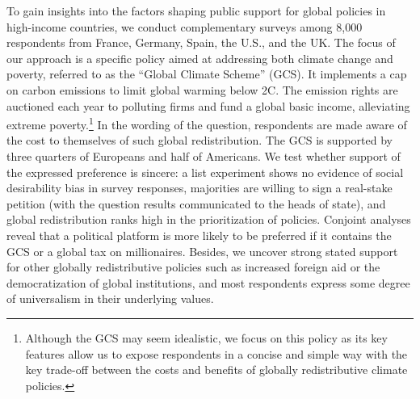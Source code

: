 To gain insights into the factors shaping public support for global policies in high-income countries, we conduct complementary surveys among 8,000 respondents from France, Germany, Spain, the U.S., and the UK. The focus of our approach is a specific policy aimed at addressing both climate change and poverty, referred to as the ``Global Climate Scheme'' (GCS). It implements a cap on carbon emissions to limit global warming below 2\textdegree{}C. The emission rights are auctioned each year to polluting firms and fund a global basic income, alleviating extreme poverty.\footnote{Although the GCS may seem idealistic, we focus on this policy as its key features allow us to expose respondents in a concise and simple way with the key trade-off between the costs and benefits of globally redistributive climate policies.} 
In the wording of the question, respondents are made aware of the cost to themselves of such global redistribution. 
The GCS is supported by three quarters of Europeans and half of Americans. We test whether support of the expressed preference is sincere: a list experiment shows no evidence of social desirability bias in survey responses, majorities are willing to sign a real-stake petition (with the question results communicated to the heads of state), and global redistribution ranks high in the prioritization of policies. Conjoint analyses reveal that a political platform is more likely to be preferred if it contains the GCS or a global tax on millionaires. 
Besides, we uncover strong stated support for other globally redistributive policies such as increased foreign aid or the democratization of global institutions, and most respondents express some degree of universalism in their underlying values. 


